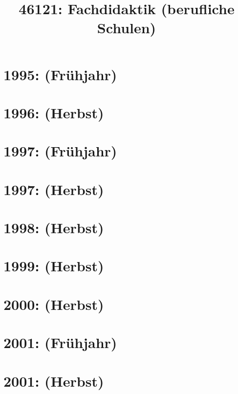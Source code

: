 \documentclass{lehramt-informatik-haupt}
\title{46121: Fachdidaktik (berufliche Schulen)}
\begin{document}
\maketitle
\tableofcontents

\section{1995: (Frühjahr)}


\section{1996: (Herbst)}


\section{1997: (Frühjahr)}


\section{1997: (Herbst)}


\section{1998: (Herbst)}


\section{1999: (Herbst)}


\section{2000: (Herbst)}


\section{2001: (Frühjahr)}


\section{2001: (Herbst)}

\end{document}
